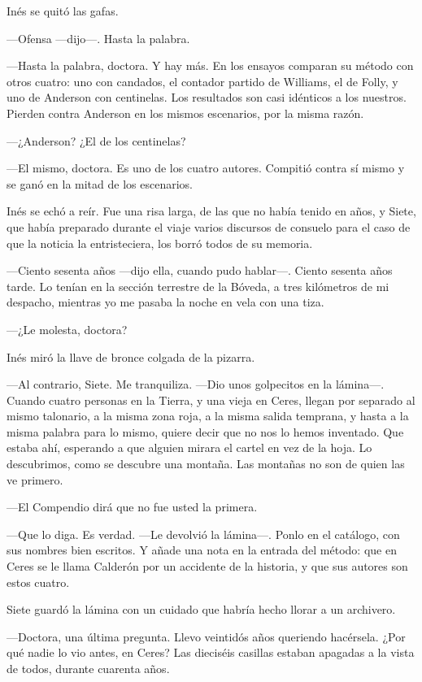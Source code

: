 Inés se quitó las gafas.

---Ofensa ---dijo---\nobreak. Hasta la palabra.

---Hasta la palabra, doctora. Y hay más. En los ensayos comparan su método con otros cuatro: uno con candados, el contador partido de Williams, el de Folly, y uno de Anderson con centinelas. Los resultados son casi idénticos a los nuestros. Pierden contra Anderson en los mismos escenarios, por la misma razón.

---¿Anderson? ¿El de los centinelas?

---El mismo, doctora. Es uno de los cuatro autores. Compitió contra sí mismo y se ganó en la mitad de los escenarios.

Inés se echó a reír. Fue una risa larga, de las que no había tenido en años, y Siete, que había preparado durante el viaje varios discursos de consuelo para el caso de que la noticia la entristeciera, los borró todos de su memoria.

---Ciento sesenta años ---dijo ella, cuando pudo hablar---\nobreak. Ciento sesenta años tarde. Lo tenían en la sección terrestre de la Bóveda, a tres kilómetros de mi despacho, mientras yo me pasaba la noche en vela con una tiza.

---¿Le molesta, doctora?

Inés miró la llave de bronce colgada de la pizarra.

---Al contrario, Siete. Me tranquiliza. ---Dio unos golpecitos en la lámina---\nobreak. Cuando cuatro personas en la Tierra, y una vieja en Ceres, llegan por separado al mismo talonario, a la misma zona roja, a la misma salida temprana, y hasta a la misma palabra para lo mismo, quiere decir que no nos lo hemos inventado. Que estaba ahí, esperando a que alguien mirara el cartel en vez de la hoja. Lo descubrimos, como se descubre una montaña. Las montañas no son de quien las ve primero.

---El Compendio dirá que no fue usted la primera.

---Que lo diga. Es verdad. ---Le devolvió la lámina---\nobreak. Ponlo en el catálogo, con sus nombres bien escritos. Y añade una nota en la entrada del método: que en Ceres se le llama Calderón por un accidente de la historia, y que sus autores son estos cuatro.

Siete guardó la lámina con un cuidado que habría hecho llorar a un archivero.

---Doctora, una última pregunta. Llevo veintidós años queriendo hacérsela. ¿Por qué nadie lo vio antes, en Ceres? Las dieciséis casillas estaban apagadas a la vista de todos, durante cuarenta años.

